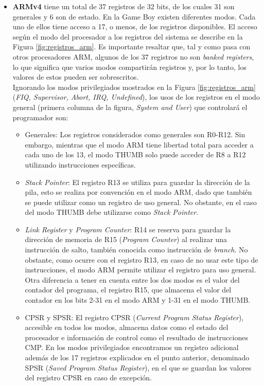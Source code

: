 \begin{itemize}
	\item \textbf{ARMv4} tiene un total de 37 registros de 32 bits, de los cuales 31 son generales y 6 son de estado. En la Game Boy existen diferentes modos. Cada uno de ellos tiene acceso a 17, o menos, de los registros disponibles. El acceso según el modo del procesador a los registros del sistema se describe en la Figura \ref{fig:registros_arm}. Es importante resaltar que, tal y como pasa con otros procesadores ARM, algunos de los 37 registros no son \textit{banked registers}, lo que significa que varios modos compartirán registros y, por lo tanto, los valores de estos pueden ser sobrescritos. \\

	Ignorando los modos privilegiados mostrados en la Figura \ref{fig:registros_arm} (\textit{FIQ, Supervisor, Abort, IRQ, Undefined}), los usos de los registros en el modo general (primera columna de la figura, \textit{System and User}) que controlará el programador son:

		\begin{itemize}
			\item Generales: Los registros considerados como generales son R0-R12. Sin embargo, mientras que el modo ARM tiene libertad total para acceder a cada uno de los 13, el modo THUMB solo puede acceder de R8 a R12 utilizando instrucciones específicas. 
			\item \textit{Stack Pointer}: El registro R13 se utiliza para guardar la dirección de la pila, esto se realiza por convención en el modo ARM, dado que también se puede utilizar como un registro de uso general. No obstante, en el caso del modo THUMB debe utilizarse como \textit{Stack Pointer}.
			\item \textit{Link Register} y \textit{Program Counter}: R14 se reserva para guardar la dirección de memoria de R15 (\textit{Program Counter}) al realizar una instrucción de salto, también conocida como instrucción de \textit{branch}. No obstante, como ocurre con el registro R13, en caso de no usar este tipo de instrucciones, el modo ARM permite utilizar el registro para uso general. Otra diferencia a tener en cuenta entre los dos modos es el valor del contador del programa, el registro R15, que almacena el valor del contador en los bits 2-31 en el modo ARM y 1-31 en el modo THUMB.
			\item CPSR y SPSR: El registro CPSR (\textit{Current Program Status Register}), accesible en todos los modos, almacena datos como el estado del procesador e información de control como el resultado de instrucciones CMP. En los modos privilegiados encontramos un registro adicional además de los 17 registros explicados en el punto anterior, denominado SPSR (\textit{Saved Program Status Register}), en el que se guardan los valores del registro CPSR en caso de excepción.
		\end{itemize}


\end{itemize}
